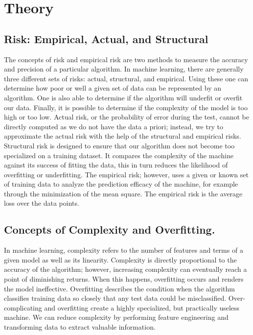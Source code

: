 \documentclass[journal]{IEEEtran}
\begin{document}
\section{Theory}

\subsection{Risk: Empirical, Actual, and Structural}

The concepts of risk and empirical risk are two methods to measure the accuracy and precision of a particular algorithm. In machine learning, there are generally three different sets of risks: actual, structural, and empirical. Using these one can determine how poor or well a given set of data can be represented by an algorithm. One is also able to determine if the algorithm will underfit or overfit our data. Finally, it is possible to determine if the complexity of the model is too high or too low. Actual risk, or the probability of error during the test, cannot be directly computed as we do not have the data a priori; instead, we try to approximate the actual risk with the help of the structural and empirical risks. Structural risk is designed to ensure that our algorithm does not become too specialized on a training dataset. It compares the complexity of the machine against its success of fitting the data, this in turn reduces the likelihood of overfitting or underfitting. The empirical risk; however, uses a given or known set of training data to analyze the prediction efficacy of the machine, for example through the minimization of the mean square. The empirical risk is the average loss over the data points.

\subsection{Concepts of Complexity and Overfitting.}
In machine learning, complexity refers to the number of features and terms of a given model as well as its linearity. Complexity is directly proportional to the accuracy of the algorithm; however, increasing complexity can eventually reach a point of diminishing returns. When this happens, overfitting occurs and renders the model ineffective. Overfitting describes the condition when the algorithm classifies training data so closely that any test data could be misclassified. Over-complicating and overfitting create a highly specialized, but practically useless machine. We can reduce complexity by performing feature engineering and transforming data to extract valuable information.
\end{document}
